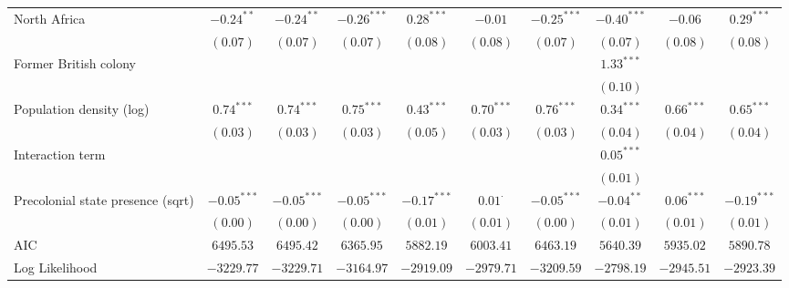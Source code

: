\begin{sidewaystable}
\begin{center}
{\begin{tabular}{l c c c c c c c c c}
North Africa                          & $-0.24^{**}$  & $-0.24^{**}$  & $-0.26^{***}$ & $0.28^{***}$  & $-0.01$        & $-0.25^{***}$ & $-0.40^{***}$   & $-0.06$       & $0.29^{***}$  \\
                                      & $(0.07)$      & $(0.07)$      & $(0.07)$      & $(0.08)$      & $(0.08)$       & $(0.07)$      & $(0.07)$        & $(0.08)$      & $(0.08)$      \\
Former British colony                 &               &               &               &               &                &               & $1.33^{***}$    &               &               \\
                                      &               &               &               &               &                &               & $(0.10)$        &               &               \\
Population density (log)              & $0.74^{***}$  & $0.74^{***}$  & $0.75^{***}$  & $0.43^{***}$  & $0.70^{***}$   & $0.76^{***}$  & $0.34^{***}$    & $0.66^{***}$  & $0.65^{***}$  \\
                                      & $(0.03)$      & $(0.03)$      & $(0.03)$      & $(0.05)$      & $(0.03)$       & $(0.03)$      & $(0.04)$        & $(0.04)$      & $(0.04)$      \\
Interaction term                      &               &               &               &               &                &               & $0.05^{***}$    &               &               \\
                                      &               &               &               &               &                &               & $(0.01)$        &               &               \\
Precolonial state presence (sqrt)     & $-0.05^{***}$ & $-0.05^{***}$ & $-0.05^{***}$ & $-0.17^{***}$ & $0.01^{\cdot}$ & $-0.05^{***}$ & $-0.04^{**}$    & $0.06^{***}$  & $-0.19^{***}$ \\
                                      & $(0.00)$      & $(0.00)$      & $(0.00)$      & $(0.01)$      & $(0.01)$       & $(0.00)$      & $(0.01)$        & $(0.01)$      & $(0.01)$      \\
\midrule
AIC                                   & $6495.53$     & $6495.42$     & $6365.95$     & $5882.19$     & $6003.41$      & $6463.19$     & $5640.39$       & $5935.02$     & $5890.78$     \\
Log Likelihood                        & $-3229.77$    & $-3229.71$    & $-3164.97$    & $-2919.09$    & $-2979.71$     & $-3209.59$    & $-2798.19$      & $-2945.51$    & $-2923.39$    \\

\end{tabular}}
\end{center}
\end{sidewaystable}
